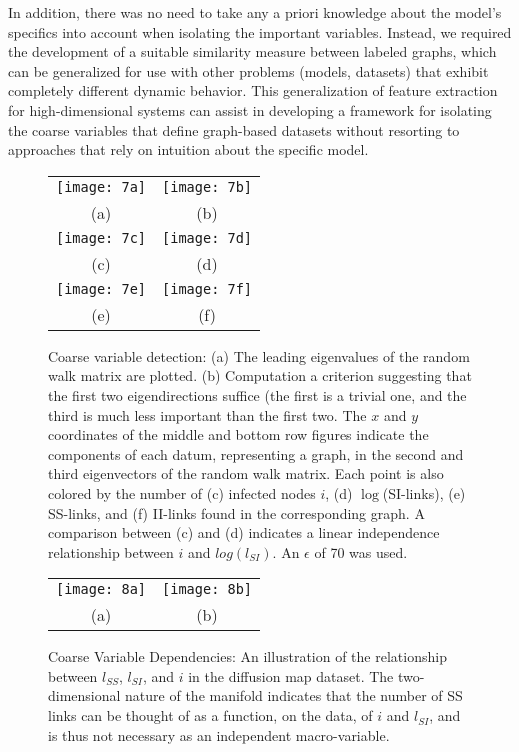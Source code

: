 In addition, there was no need to take any a priori knowledge about
the model's specifics into account when isolating the important
variables. Instead, we required the development of a suitable
similarity measure between labeled graphs, which can be generalized
for use with other problems (models, datasets) that exhibit completely
different dynamic behavior. This generalization of feature extraction
for high-dimensional systems can assist in developing a framework for
isolating the coarse variables that define graph-based datasets
without resorting to approaches that rely on intuition about the
specific model.


\begin{figure}[!htp]
\centering
\begin{tabular}{cc}
  \texttt{[image: 7a]} &
  \texttt{[image: 7b]}\\
  (a) & (b)\\
  \texttt{[image: 7c]} &
  \texttt{[image: 7d]}\\
  (c) & (d)\\
  \texttt{[image: 7e]} &
  \texttt{[image: 7f]}\\
  (e) & (f)
\end{tabular}
\caption{Coarse variable detection: (a) The leading eigenvalues of the
  random walk matrix are plotted. (b) Computation a criterion
  suggesting that the first two eigendirections suffice (the first is
  a trivial one, and the third is much less important than the first
  two. The $x$ and $y$ coordinates of the middle and bottom row
  figures indicate the components of each datum, representing a graph,
  in the second and third eigenvectors of the random walk matrix. Each
  point is also colored by the number of (c) infected nodes $i$, (d)
  $\log$(SI-links), (e) SS-links, and (f) II-links found in the
  corresponding graph. A comparison between (c) and (d) indicates a
  linear independence relationship between $i$ and $log(l_{SI})$. An
  $\epsilon$ of 70 was used. \label{fig:sis7}}
\end{figure}

\begin{figure}[!htp]
\centering
\begin{tabular}{cc}
  \texttt{[image: 8a]} &
  \texttt{[image: 8b]}\\
  (a) & (b)
\end{tabular}
\caption{Coarse Variable Dependencies: An illustration of the
  relationship between $l_{SS}$, $l_{SI}$, and $i$ in the diffusion
  map dataset. The two-dimensional nature of the manifold indicates
  that the number of SS links can be thought of as a function, on the
  data, of $i$ and $l_{SI}$, and is thus not necessary as an
  independent macro-variable. \label{fig:sis8}}
\end{figure}


